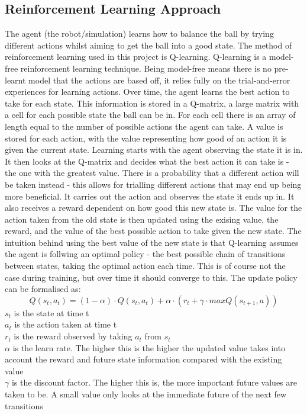 \documentclass[12pt,a4paper]{article}
\begin{document}
\subsection{Reinforcement Learning Approach}
The agent (the robot/simulation) learns how to balance the ball by trying different actions whilst aiming to get the ball into a good state. The method of reinforcement learning used in this project is Q-learning. Q-learning is a model-free reinforcement learning technique. Being model-free means there is no pre-learnt model that the actions are based off, it relies fully on the trial-and-error experiences for learning actions. Over time, the agent learns the best action to take for each state. This information is stored in a Q-matrix, a large matrix with a cell for each possible state the ball can be in. For each cell there is an array of length equal to the number of possible actions the agent can take. A value is stored for each action, with the value representing how good of an action it is given the current state. Learning starts with the agent observing the state it is in. It then looks at the Q-matrix and decides what the best action it can take is - the one with the greatest value. There is a probability that a different action will be taken instead - this allows for trialling different actions that may end up being more beneficial. It carries out the action and observes the state it ends up in. It also receives a reward dependent on how good this new state is. The value for the action taken from the old state is then updated using the exising value, the reward, and the value of the best possible action to take given the new state. The intuition behind using the best value of the new state is that Q-learning assumes the agent is follwing an optimal policy - the best possible chain of transitions between states, taking the optimal action each time. This is of course not the case during training, but over time it should converge to this. The update policy can be formalised as:
\[Q(s_t, a_t) = (1 - \alpha) \cdot Q(s_t, a_t) + \alpha\cdot(r_t + \gamma\cdot max Q(s_{t+1}, a)) \]
$s_t$ is the state at time t \\
$a_t$ is the action taken at time t \\
$r_t$ is the reward observed by taking $a_t$ from $s_t$\\
$\alpha$ is the learn rate. The higher this is the higher the updated value takes into account the reward and future state information compared with the existing value\\
$\gamma$ is the discount factor. The higher this is, the more important future values are taken to be. A small value only looks at the immediate future of the next few transitions\\
\end{document}
